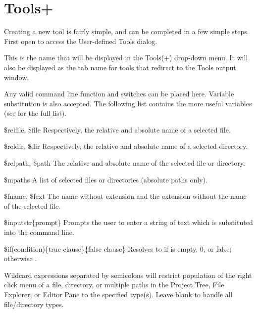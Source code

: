 \section{Tools+}\label{sec:tools+}

Creating a new tool is fairly simple, and can be completed in a few simple steps. First open  to access the User-defined Tools dialog.



This is the name that will be displayed in the Tools(+) drop-down menu. It will also be displayed as the tab name for tools that redirect to the Tools output window.


Any valid command line function and switches can be placed here. Variable substitution is also accepted. The following list contains the more useful variables (see  for the full list).

\begin{codeentry}
\item[\$relfile, \$file] Respectively, the relative and absolute name of a selected file.
\item[\$reldir, \$dir] Respectively, the relative and absolute name of a selected directory.
\item[\$relpath, \$path] The relative and absolute name of the selected file or directory.
\item[\$mpaths] A list of selected files or directories (absolute paths only).
\item[\$fname, \$fext] The name without extension and the extension without the name of the selected file.
\item[\$inputstr\{prompt\}] Prompts the user to enter a string of text which is substituted into the command line.
\item[\$if(condition)\{true clause\}\{false clause\}] Resolves to  if  is empty, 0, or false; otherwise .
\end{codeentry}


Wildcard expressions separated by semicolons will restrict population of the right click menu of a file, directory, or multiple paths in the Project Tree, File Explorer, or Editor Pane to the specified type(s). Leave blank to handle all file/directory types. 

